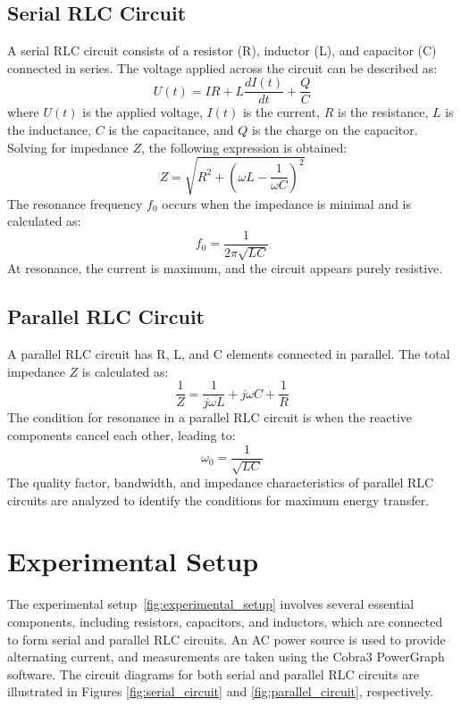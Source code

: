 \documentclass[journal]{IEEEtran}
\begin{document}
\subsection{Serial RLC Circuit}
A serial RLC circuit consists of a resistor (R), inductor (L), and capacitor (C) connected in series. The voltage applied across the circuit can be described as:
\begin{equation}
    U(t) = IR + L\frac{dI(t)}{dt} + \frac{Q}{C}
\end{equation}
where $U(t)$ is the applied voltage, $I(t)$ is the current, $R$ is the resistance, $L$ is the inductance, $C$ is the capacitance, and $Q$ is the charge on the capacitor. Solving for impedance $Z$, the following expression is obtained:
\begin{equation}
    Z = \sqrt{R^2 + \left(\omega L - \frac{1}{\omega C}\right)^2}
\end{equation}
The resonance frequency $f_0$ occurs when the impedance is minimal and is calculated as:
\begin{equation}
    f_0 = \frac{1}{2\pi \sqrt{LC}}
\end{equation}
At resonance, the current is maximum, and the circuit appears purely resistive.

\subsection{Parallel RLC Circuit}
A parallel RLC circuit has R, L, and C elements connected in parallel. The total impedance $Z$ is calculated as:
\begin{equation}
    \frac{1}{Z} = \frac{1}{j\omega L} + j\omega C + \frac{1}{R}
\end{equation}
The condition for resonance in a parallel RLC circuit is when the reactive components cancel each other, leading to:
\begin{equation}
    \omega_0 = \frac{1}{\sqrt{LC}}
\end{equation}
The quality factor, bandwidth, and impedance characteristics of parallel RLC circuits are analyzed to identify the conditions for maximum energy transfer.

\section{Experimental Setup}
The experimental setup~\ref{fig:experimental_setup} involves several essential components, including resistors, capacitors, and inductors, which are connected to form serial and parallel RLC circuits. An AC power source is used to provide alternating current, and measurements are taken using the Cobra3 PowerGraph software. The circuit diagrams for both serial and parallel RLC circuits are illustrated in Figures \ref{fig:serial_circuit} and \ref{fig:parallel_circuit}, respectively.
\end{document}
